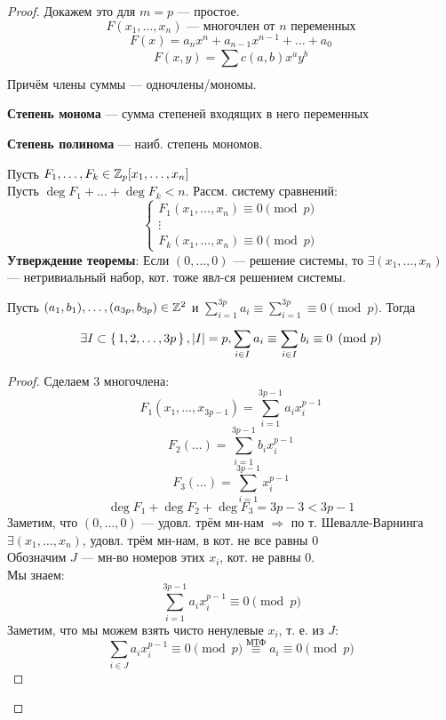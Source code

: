 \begin{proof}
Докажем это для $m = p$ --- простое.
\[
F(x_1, \ldots, x_n) \text{ --- многочлен от $n$ переменных}
\]
\[
F(x) = a_n x^{n} + a_{n - 1}x^{n - 1} + \ldots + a_0
\]
\[
F(x, y) = \sum_{}^{} c(a, b) x^{a}y^{b}
\]
Причём члены суммы --- одночлены/мономы.
\begin{definition}
\textbf{Степень монома} --- сумма степеней входящих в него переменных
\end{definition}
\begin{definition}
  \textbf{Степень полинома} --- наиб. степень мономов.
\end{definition}
\begin{theorem}
\label{th:shevalle-warning}
Пусть $F_1, \ldots, F_k \in \mathbb{Z}_p[x_1, \ldots, x_n]$  \\
Пусть $\deg F_1 + \ldots + \deg F_k < n$. Рассм. систему сравнений:
\[
\begin{cases}
F_1(x_1, \ldots, x_n) \equiv 0 \pmod p \\
\vdots \\
F_k(x_1, \ldots, x_n) \equiv 0 \pmod p
\end{cases}
\]
\textbf{Утверждение теоремы}: Если $(0, \ldots, 0)$ --- решение системы, то $\exists (x_1, \ldots, x_n)$ --- нетривиальный набор, кот. тоже явл-ся решением системы.
\end{theorem}
\begin{lemma}
Пусть $(a_1, b_1), \ldots, (a_{3p}, b_{3p}) \in \mathbb{Z}^{2}$ и $\sum_{i = 1}^{3p} a_i \equiv \sum_{i = 1}^{3p} \equiv 0 \pmod p$. Тогда
\[
  \exists I \subset \set{1, 2, \ldots, 3p}, \left|I\right| = p, \sum_{i \in I}^{} a_i \equiv \sum_{i \in I}^{} b_i \equiv 0 \pmod p
\]
\end{lemma}
\begin{proof}
 Сделаем 3 многочлена:
 \[
 F_1(x_1, \ldots, x_{3p - 1}) = \sum_{i = 1}^{3p - 1} a_i x_{i}^{p - 1}
 \]
 \[
 F_2(\ldots) = \sum_{i = 1}^{3p - 1} b_i x_i^{p - 1}
 \]
 \[
 F_3(\ldots) = \sum_{ i = 1}^{3p - 1} x_i^{p - 1}
 \]
 \[
 \deg F_1 + \deg F_2 + \deg F_3 = 3p - 3 < 3p - 1
 \]
 Заметим, что $(0, \ldots, 0)$ --- удовл. трём мн-нам $\Rightarrow$ по т. Шевалле-Варнинга $\exists (x_1, \ldots, x_n)$, удовл. трём мн-нам, в кот. не все равны $0$ \\
 Обозначим $J$ --- мн-во номеров этих $x_i$, кот. не равны $0$. \\
 Мы знаем:
 \[
   \sum_{i = 1}^{3p - 1} a_i x_i^{p - 1} \equiv 0 \pmod p
 \]
 Заметим, что мы можем взять чисто ненулевые $x_i$, т. е. из $J$:
 \[
  \sum_{i \in J}^{} a_i x_i^{p - 1} \equiv 0 \pmod p \overset{\text{МТФ}}{\equiv} a_i \equiv 0 \pmod p
\]
\end{proof}
\end{proof}
